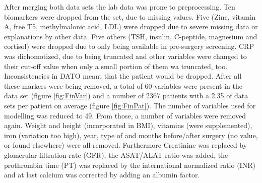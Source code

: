 \documentclass[10pt,a4paper]{article}
\begin{document}
	After merging both data sets the lab data was prone to preprocessing. Ten biomarkers were dropped from the set, due to missing values. Five (Zinc, vitamin A, free T5, methylmalonic acid, LDL) were dropped due to severe missing data or explanations by other data. Five others (TSH, insulin, C-peptide, magnesium and cortisol) were dropped due to only being available in pre-surgery screening. CRP was dichomotized, due to being truncated and other variables were changed to their cut-off value when only a small portion of them wa truncated, too. Inconsistencies in DATO meant that the patient would be dropped. After all these markers were being removed, a total of 60 variables were present in the data set (figure \ref{fig:FinVar}) and a number of 2367 patients with a 2.35 of data sets per patient on average (figure \ref{fig:FinPat}). The number of variables used for modelling was reduced to 49. From those, a number of variables were removed again. Weight and height (incorporated in BMI), vitamins (were supplemented), iron (variation too high), year, type of and months before/after surgery (no value, or found elsewhere) were all removed. Furthermore Creatinine was replaced by glomerular filtration rate (GFR), the ASAT/ALAT ratio was added, the prothrombin time (PT) was replaced by the international normalized ratio (INR) and at last calcium was corrected by adding an albumin factor. 
	
\end{document}
